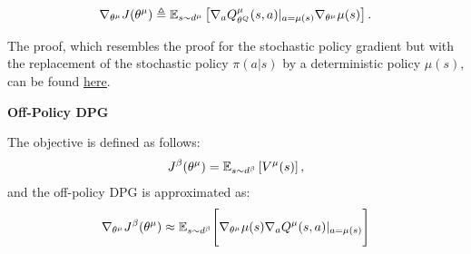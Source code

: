 \documentclass{article}
\begin{document}
\begin{align*}
\nabla_{\theta^\mu} J(\theta^\mu) \triangleq {\mathbb E}_{s \sim d^\mu}\left[\nabla_{a} Q^\mu_{\theta^Q}(s,a)\vert_{a = \mu(s)} \nabla_{\theta^\mu}\mu(s) \right].
\end{align*}

The proof, which resembles the proof for the stochastic policy gradient but with the replacement of the stochastic policy $\pi(a\vert s)$ by a deterministic policy $\mu(s)$, can be found \href{http://proceedings.mlr.press/v32/silver14-supp.pdf}{\underline{here}}.

\vspace{10pt}
\noindent\textbf{Off-Policy DPG}

\noindent The objective is defined as follows:
\begin{align}\label{eq:off_policy_dpg_objective}
J^\beta(\theta^\mu) = {\mathbb E}_{s \sim d^\beta} \left[V^\mu(s)\right],
\end{align}
and the off-policy DPG is approximated as:
\begin{align}\label{eq:off_policy_dpg}
    \nabla_{\theta^\mu} J^\beta(\theta^\mu) \approx {\mathbb E}_{s \sim d^\beta} \Bigg[\nabla_{\theta^\mu} \mu(s) \nabla_a Q^\mu(s,a)\vert_{a=\mu(s)}\Bigg]
\end{align}
\end{document}
